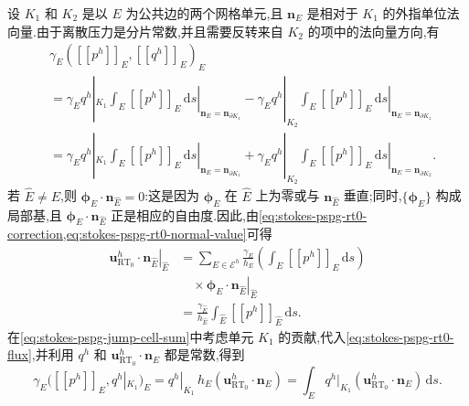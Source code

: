 \begin{note}
设 $K_1$ 和 $K_2$ 是以 $E$ 为公共边的两个网格单元,且 $\bm{n}_E$ 是相对于 $K_1$ 的外指单位法向量.由于离散压力是分片常数,并且需要反转来自 $K_2$ 的项中的法向量方向,有
\begin{equation}\label{eq:stokes-pspg-jump-cell-sum}
\begin{aligned}
 &\gamma_E([[p^h]]_E,[[q^h]]_E)_E\\
 &=\gamma_E q^h|_{K_1}
      \left.\int_E[[p^h]]_E\,\mathrm{d}s\right|_{\bm{n}_E=\bm{n}_{\partial K_1}}
   -\gamma_E q^h|_{K_2}
      \left.\int_E[[p^h]]_E\,\mathrm{d}s\right|_{\bm{n}_E=\bm{n}_{\partial K_1}}\\
 &=\gamma_E q^h|_{K_1}
      \left.\int_E[[p^h]]_E\,\mathrm{d}s\right|_{\bm{n}_E=\bm{n}_{\partial K_1}}
   +\gamma_E q^h|_{K_2}
      \left.\int_E[[p^h]]_E\,\mathrm{d}s\right|_{\bm{n}_E=\bm{n}_{\partial K_2}}.
\end{aligned}
\end{equation}
若 $\widehat E\ne E$,则 $\symbf{\phi}_E\cdot\bm{n}_{\widehat E}=0$:这是因为 $\symbf{\phi}_E$ 在 $\widehat E$ 上为零或与 $\bm{n}_{\widehat E}$ 垂直;同时,$\{\symbf{\phi}_E\}$ 构成局部基,且 $\symbf{\phi}_E\cdot\bm{n}_{\widehat E}$ 正是相应的自由度.因此,由\cref{eq:stokes-pspg-rt0-correction,eq:stokes-pspg-rt0-normal-value}可得
\begin{equation}\label{eq:stokes-pspg-rt0-flux}
\begin{aligned}
 \left.\bm{u}_{\mathrm{RT}_0}^h\cdot\bm{n}_{\widehat E}\right|_{\widehat E}
 &=\sum_{E\in\mathcal{E}^h}\frac{\gamma_E}{h_E}
    \left(\int_E[[p^h]]_E\,\mathrm{d}s\right)\\
 &\quad\times\left.\symbf{\phi}_E\cdot\bm{n}_{\widehat E}\right|_{\widehat E}\\
 &=\frac{\gamma_{\widehat E}}{h_{\widehat E}}
    \int_{\widehat E}[[p^h]]_{\widehat E}\,\mathrm{d}s.
\end{aligned}
\end{equation}
在\cref{eq:stokes-pspg-jump-cell-sum}中考虑单元 $K_1$ 的贡献,代入\cref{eq:stokes-pspg-rt0-flux},并利用 $q^h$ 和 $\bm{u}_{\mathrm{RT}_0}^h\cdot\bm{n}_E$ 都是常数,得到
\begin{equation}\label{eq:stokes-pspg-jump-flux-identity}
 \gamma_E([[p^h]]_E,q^h|_{K_1})_E
 =q^h|_{K_1}\,h_E
     (\bm{u}_{\mathrm{RT}_0}^h\cdot\bm{n}_E)
 =\int_E q^h|_{K_1}
     (\bm{u}_{\mathrm{RT}_0}^h\cdot\bm{n}_E)\,\mathrm{d}s.
\end{equation}


\end{note}
